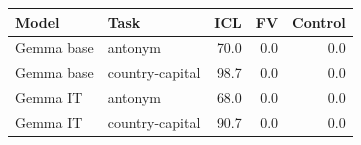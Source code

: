 \begin{tabular}{llrrr}
\toprule
Model & Task & ICL & FV & Control \\
\midrule
Gemma base & antonym & 70.0 & 0.0 & 0.0 \\
Gemma base & country-capital & 98.7 & 0.0 & 0.0 \\
Gemma IT & antonym & 68.0 & 0.0 & 0.0 \\
Gemma IT & country-capital & 90.7 & 0.0 & 0.0 \\
\bottomrule
\end{tabular}
